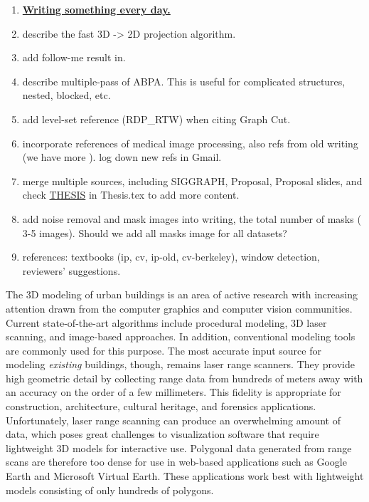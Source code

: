 \begin{enumerate}
\item {\bf \underline{Writing something every day.}}
\item describe the fast 3D -> 2D projection algorithm.
\item add follow-me result in.
\item describe multiple-pass of ABPA. This is useful for complicated structures, nested, blocked, etc.
\item add level-set reference (RDP\_RTW) when citing Graph Cut.
\item incorporate references of medical image processing, also refs from old writing (we have more ). log down new refs in Gmail.
\item merge multiple sources, including SIGGRAPH, Proposal, Proposal slides, and check \underline{THESIS} in Thesis.tex to add more content.
\item add noise removal and mask images into writing, the total number of masks ( 3-5 images). Should we add all masks image for all datasets?
\item references: textbooks (ip, cv, ip-old, cv-berkeley), window detection, reviewers' suggestions.
\end{enumerate}

\newpage


The 3D modeling of urban buildings is an area of active research
with increasing attention drawn from the computer graphics and
computer vision communities.
Current state-of-the-art algorithms include procedural modeling,
3D laser scanning, and image-based approaches.
In addition, conventional modeling tools are commonly used for this purpose.
The most accurate input source for modeling {\it existing} buildings, though,
remains laser range scanners.
They provide high geometric detail by collecting range data from hundreds
of meters away with an accuracy on the order of a few millimeters.
This fidelity is appropriate for construction, architecture, cultural
heritage, and forensics applications.
Unfortunately, laser range scanning can produce an overwhelming amount of data,
which poses great challenges to visualization software that require lightweight
3D models for interactive use.
Polygonal data generated from range scans are therefore too dense for use in
web-based applications such as Google Earth and Microsoft Virtual Earth.
These applications work best with lightweight models consisting of only
hundreds of polygons.

